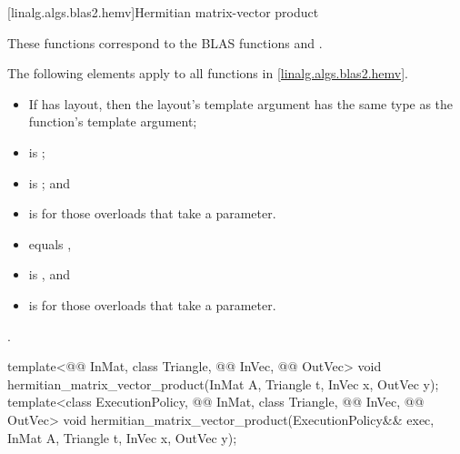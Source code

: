 [linalg.algs.blas2.hemv]{Hermitian matrix-vector product}

\pnum
\begin{note}
These functions correspond to the BLAS functions
 and \supercite{blas2}.
\end{note}

\pnum
The following elements apply to all functions in \ref{linalg.algs.blas2.hemv}.

\pnum
\mandates
\begin{itemize}
\item
If  has  layout,
then the layout's  template argument
has the same type as the function's  template argument;
\item
{}
is ;
\item
{}
is ; and
\item
{}
is  for those overloads that take a  parameter.
\end{itemize}

\pnum
\expects
\begin{itemize}
\item
{} equals ,
\item
{} is , and
\item
{} is  for those overloads that take a  parameter.
\end{itemize}

\pnum
\complexity
{}.

\begin{itemdecl}
template<@@ InMat, class Triangle, @@ InVec, @@ OutVec>
  void hermitian_matrix_vector_product(InMat A, Triangle t, InVec x, OutVec y);
template<class ExecutionPolicy,
         @@ InMat, class Triangle, @@ InVec, @@ OutVec>
  void hermitian_matrix_vector_product(ExecutionPolicy&& exec,
                                       InMat A, Triangle t, InVec x, OutVec y);
\end{itemdecl}

